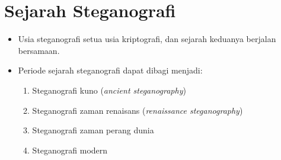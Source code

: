 \documentclass{article}
\begin{document}

\section*{Sejarah Steganografi}

\begin{itemize}
    \item Usia steganografi setua usia kriptografi, dan sejarah keduanya berjalan bersamaan.
\end{itemize}

\begin{itemize}
    \item Periode sejarah steganografi dapat dibagi menjadi:
    \begin{enumerate}
        \item Steganografi kuno (\textit{ancient steganography})
        \item Steganografi zaman renaisans (\textit{renaissance steganography})
        \item Steganografi zaman perang dunia
        \item Steganografi modern
    \end{enumerate}
\end{itemize}
\end{document}
